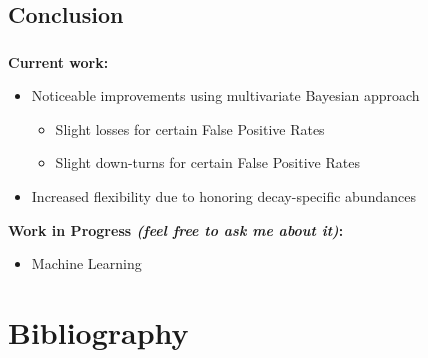\documentclass{beamer}
\begin{document}
\subsection{Conclusion}
\begin{frame}
	\frametitle{\insertsection}
	\framesubtitle{\insertsubsection}

	\textbf{Current work:}\\
	\begin{itemize}
		\item Noticeable improvements using multivariate Bayesian approach
		\begin{itemize}
			\item Slight losses for certain False Positive Rates
			\item Slight down-turns for certain False Positive Rates
		\end{itemize}
		\item Increased flexibility due to honoring decay-specific abundances
	\end{itemize}

	\vspace{2em}
	\textbf{Work in Progress \textit{(feel free to ask me about it)}:}\\
	\begin{itemize}
		\item Machine Learning
	\end{itemize}
\end{frame}

\section*{Bibliography}
\begin{frame}
	\frametitle{\insertsection}

	\printbibliography
\end{frame}
\end{document}
